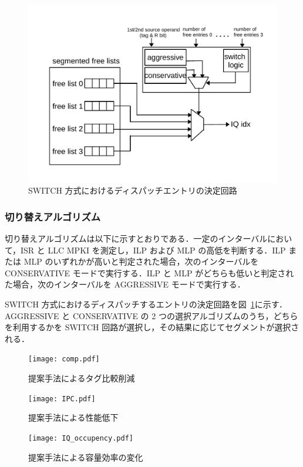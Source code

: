 \documentclass[submit,techrep,noauthor]{ipsj}
\newcommand{\fig}[1]{{図~\ref{fig:#1}}}
\begin{document}
\begin{figure}[htb]
  \centering
  \includegraphics[keepaspectratio, scale=.8]{switch.pdf}
  \caption{SWITCH 方式におけるディスパッチエントリの決定回路}
  \label{fig:switch}
\end{figure}

\subsubsection{切り替えアルゴリズム}
切り替えアルゴリズムは以下に示すとおりである．一定のインターバルにおいて，ISR と LLC MPKI を測定し，ILP および MLP の高低を判断する．ILP または MLP のいずれかが高いと判定された場合，次のインターバルを CONSERVATIVE モードで実行する．ILP と MLP がどちらも低いと判定された場合，次のインターバルを AGGRESSIVE モードで実行する．

SWITCH 方式におけるディスパッチするエントリの決定回路を\fig{switch}に示す．AGGRESSIVE と CONSERVATIVE の 2 つの選択アルゴリズムのうち，どちらを利用するかを SWITCH 回路が選択し，その結果に応じてセグメントが選択される．

\begin{figure}[htb]
  \centering
  \texttt{[image: comp.pdf]}
  \caption{提案手法によるタグ比較削減}
  \label{fig:comp}

  \vspace{0.5cm}

  \texttt{[image: IPC.pdf]}
  \caption{提案手法による性能低下}
  \label{fig:IPC}

  \vspace{0.5cm}

  \texttt{[image: IQ\_occupency.pdf]}
  \caption{提案手法による容量効率の変化}
  \label{fig:IQ_occupency}
\end{figure}
\end{document}

